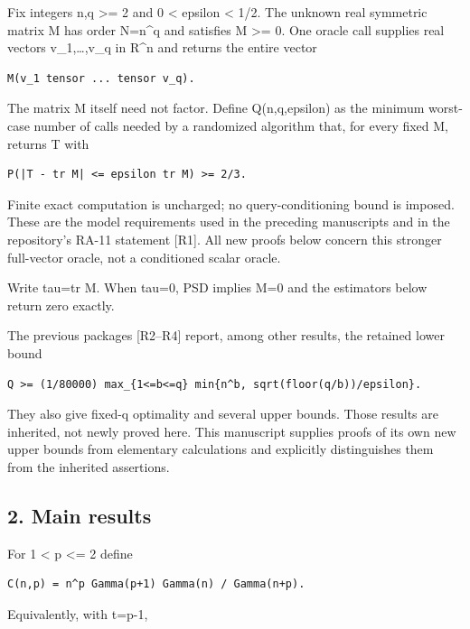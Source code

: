 \documentclass[
  10pt,
]{article}
\begin{document}
Fix integers n,q \textgreater= 2 and 0 \textless{} epsilon \textless{}
1/2. The unknown real symmetric matrix M has order N=n\^{}q and
satisfies M \textgreater= 0. One oracle call supplies real vectors
v\_1,\ldots,v\_q in R\^{}n and returns the entire vector

\begin{verbatim}
M(v_1 tensor ... tensor v_q).
\end{verbatim}

The matrix M itself need not factor. Define Q(n,q,epsilon) as the
minimum worst-case number of calls needed by a randomized algorithm
that, for every fixed M, returns T with

\begin{verbatim}
P(|T - tr M| <= epsilon tr M) >= 2/3.
\end{verbatim}

Finite exact computation is uncharged; no query-conditioning bound is
imposed. These are the model requirements used in the preceding
manuscripts and in the repository's RA-11 statement {[}R1{]}. All new
proofs below concern this stronger full-vector oracle, not a conditioned
scalar oracle.

Write tau=tr M. When tau=0, PSD implies M=0 and the estimators below
return zero exactly.

The previous packages {[}R2--R4{]} report, among other results, the
retained lower bound

\begin{verbatim}
Q >= (1/80000) max_{1<=b<=q} min{n^b, sqrt(floor(q/b))/epsilon}.
\end{verbatim}

They also give fixed-q optimality and several upper bounds. Those
results are inherited, not newly proved here. This manuscript supplies
proofs of its own new upper bounds from elementary calculations and
explicitly distinguishes them from the inherited assertions.

\subsection{2. Main results}\label{main-results}

For 1 \textless{} p \textless= 2 define

\begin{verbatim}
C(n,p) = n^p Gamma(p+1) Gamma(n) / Gamma(n+p).
\end{verbatim}

Equivalently, with t=p-1,
\end{document}
